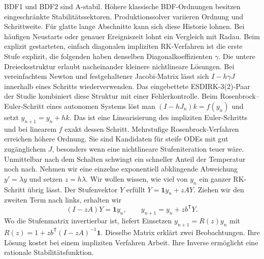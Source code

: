 BDF1 und BDF2 sind A-stabil. Höhere klassische BDF-Ordnungen besitzen eingeschränkte Stabilitätssektoren. Produktionssolver variieren Ordnung und Schrittweite. Für glatte lange Abschnitte kann sich diese Historie lohnen. Bei häufigen Neustarts oder genauer Ereigniszeit lohnt ein Vergleich mit Radau.
Beim explizit gestarteten, einfach diagonalen impliziten RK-Verfahren ist die erste Stufe explizit, die folgenden haben denselben Diagonalkoeffizienten \(\gamma\). Die untere Dreiecksstruktur erlaubt nacheinander kleinere nichtlineare Lösungen. Bei vereinfachtem Newton und festgehaltener Jacobi-Matrix lässt sich \(I-h\gamma J\) innerhalb eines Schritts wiederverwenden. Das eingebettete ESDIRK-3(2)-Paar der Studie kombiniert diese Struktur mit einer Fehlerkontrolle.
Beim Rosenbrock--Euler-Schritt eines autonomen Systems löst man \((I-hJ_n)k=f(y_n)\) und setzt \(y_{n+1}=y_n+hk\). Das ist eine Linearisierung des impliziten Euler-Schritts und bei linearem \(f\) exakt dessen Schritt. Mehrstufige Rosenbrock-Verfahren erreichen höhere Ordnung. Sie sind Kandidaten für steife ODEs mit gut zugänglichem \(J\), besonders wenn eine nichtlineare Stufeniteration teuer wäre.
Unmittelbar nach dem Schalten schwingt ein schneller Anteil der Temperatur noch nach. Nehmen wir eine einzelne exponentiell abklingende Abweichung \(y'=\lambda y\) und setzen \(z=h\lambda\). Wir wollen wissen, wie viel von \(y_n\) ein ganzer RK-Schritt übrig lässt. Der Stufenvektor \(Y\) erfüllt \(Y=\mathbf{1}y_n+zAY\). Ziehen wir den zweiten Term nach links, erhalten wir
\[
 (I-zA)Y=\mathbf{1}y_n,\qquad y_{n+1}=y_n+zb^\mathsf TY.
\]
Wo die Stufenmatrix invertierbar ist, liefert Einsetzen \(y_{n+1}=R(z)y_n\) mit \(R(z)=1+zb^\mathsf T(I-zA)^{-1}\mathbf{1}\). Dieselbe Matrix erklärt zwei Beobachtungen. Ihre Lösung kostet bei einem impliziten Verfahren Arbeit. Ihre Inverse ermöglicht eine rationale Stabilitätsfunktion.

